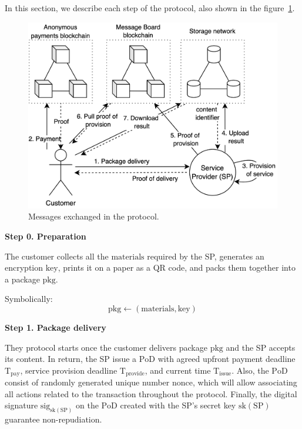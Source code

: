 \documentclass{ieeeaccess}
\begin{document}
In this section, we describe each step of the protocol, also shown in the figure~\ref{fig:protocol-diagram}.

\begin{figure}[h!]
\includegraphics[width=\linewidth]{anonser-protocol.png}
\centering
\caption{Messages exchanged in the protocol.}
\label{fig:protocol-diagram}
\end{figure}

\noindent \textbf
{Step 0.  Preparation}\label{step-0-preparation}

The customer collects all the $\mathrm{materials}$ required by the SP, generates an encryption $\mathrm{key}$, prints it on a paper as a QR code, and packs them together into a package $\mathrm{pkg}$.

Symbolically: 
\[
\mathrm{pkg} \gets (\mathrm{materials}, \mathrm{key})
\]

\noindent \textbf
{Step 1. Package delivery}\label{step-1-package-delivery}

They protocol starts once the customer delivers package $\mathrm{pkg}$ and the SP accepts its content. In return, the SP issue a $\mathrm{PoD}$ with agreed upfront payment deadline $\mathrm{T}_\mathrm{pay}$, service provision deadline $\mathrm{T}_\mathrm{provide}$, and current time $\mathrm{T}_\mathrm{issue}$. Also, the $\mathrm{PoD}$ consist of randomly generated unique number $\mathrm{nonce}$, which will allow associating all actions related to the transaction throughout the protocol. Finally, the digital signature $\mathrm{sig}_{\mathrm{sk}(\mathrm{SP})}$ on the $\mathrm{PoD}$ created with the SP's secret key $\mathrm{sk}(\mathrm{SP})$ guarantee non-repudiation.
\end{document}
